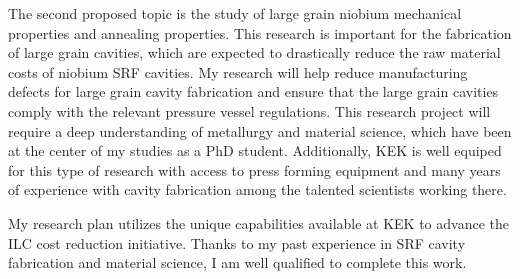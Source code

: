 \documentclass[]{revtex4-2}
\begin{document}
    The second proposed topic is the study of large grain niobium mechanical properties and annealing properties. This research is important for the fabrication of large grain cavities, which are expected to drastically reduce the raw material costs of niobium SRF cavities. My research will help reduce manufacturing defects for large grain cavity fabrication and ensure that the large grain cavities comply with the relevant pressure vessel regulations. This research project will require a deep understanding of metallurgy and material science, which have been at the center of my studies as a PhD student. Additionally, KEK is well equiped for this type of research with access to press forming equipment and many years of experience with cavity fabrication among the talented scientists working there.
    
    My research plan utilizes the unique capabilities available at KEK to advance the ILC cost reduction initiative. Thanks to my past experience in SRF cavity fabrication and material science, I am well qualified to complete this work.





\end{document}
